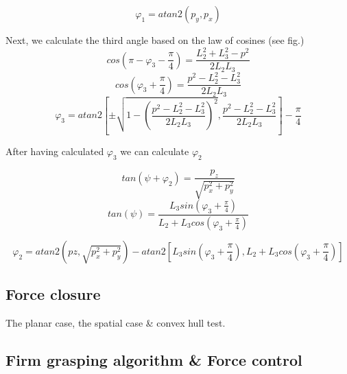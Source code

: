 \begin{equation}
φ_1 = atan2 \left( p_y, p_x \right)
\end{equation}

Next, we calculate the third angle based on the law of cosines (see fig.)
\[
cos \left( π - φ_3 - \frac{π}{4} \right) = \frac{L_2^2 + L_3^2 - p^2}{2 L_2 L_3}
\]
\[
cos \left(φ_3 + \frac{π}{4} \right) = \frac{p^2 - L_2^2 - L_3^2}{2 L_2 L_3}
\]
\begin{equation}
φ_3 = atan2 \left[ \pm \sqrt{1 - \left( \frac{p^2 - L_2^2 - L_3^2}{2 L_2 L_3} \right)^2} , \frac{p^2 - L_2^2 - L_3^2}{2 L_2 L_3} \right] - \frac{π}{4}
\end{equation}

After having calculated $φ_3$ we can calculate $φ_2 $

\[
tan \left( ψ + φ_2 \right) = \frac{p_z}{\sqrt{p_x^2 + p_y^2}}
\]
\[
tan \left( ψ \right) = \frac{L_3 sin \left( φ_3 + \frac{π}{4} \right) }{L_2 + L_3 cos \left( φ_3 + \frac{π}{4} \right)}
\]

\begin{equation}
φ_2 = atan2 \left( pz, \sqrt{p_x^2 + p_y^2} \right) - atan2 \left[ L_3 sin \left( φ_3 + \frac{π}{4} \right), L_2 + L_3 cos \left( φ_3 + \frac{π}{4} \right) \right]
\end{equation}

\subsection{Force closure}
The planar case, the spatial case \& convex hull test.

\subsection{Firm grasping algorithm \& Force control}